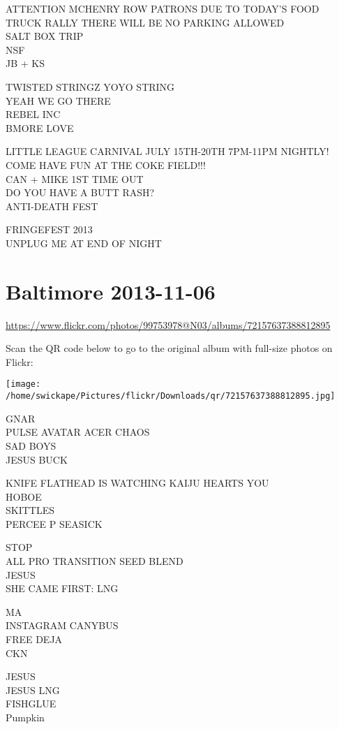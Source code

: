 \documentclass[10pt,letterpaper]{article}
\begin{document}
ATTENTION MCHENRY ROW PATRONS DUE TO TODAY'S FOOD TRUCK RALLY THERE WILL BE NO PARKING ALLOWED\\
SALT BOX TRIP\\
NSF\\
JB + KS

TWISTED STRINGZ YOYO STRING\\
YEAH WE GO THERE\\
REBEL INC\\
BMORE LOVE

LITTLE LEAGUE CARNIVAL JULY 15TH{-}20TH 7PM{-}11PM NIGHTLY! COME HAVE FUN AT THE COKE FIELD!!!\\
CAN + MIKE 1ST TIME OUT\\
DO YOU HAVE A BUTT RASH?\\
ANTI{-}DEATH FEST

FRINGEFEST 2013\\
UNPLUG ME AT END OF NIGHT


\section*{Baltimore 2013-11-06}

\url{https://www.flickr.com/photos/99753978@N03/albums/72157637388812895}

Scan the QR code below to go to the original album with full-size photos on Flickr:

\texttt{[image: /home/swickape/Pictures/flickr/Downloads/qr/72157637388812895.jpg]}


GNAR\\
PULSE AVATAR ACER CHAOS\\
SAD BOYS\\
JESUS BUCK

KNIFE FLATHEAD IS WATCHING KAIJU HEARTS YOU\\
HOBOE\\
SKITTLES\\
PERCEE P SEASICK

STOP\\
ALL PRO TRANSITION SEED BLEND\\
JESUS\\
SHE CAME FIRST: LNG

MA\\
INSTAGRAM CANYBUS\\
FREE DEJA\\
CKN

JESUS\\
JESUS LNG\\
FISHGLUE\\
Pumpkin
\end{document}
